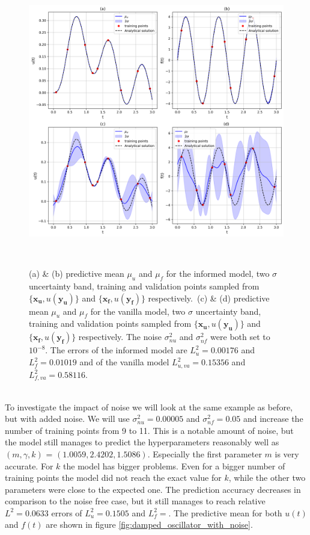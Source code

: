 \documentclass{article}
\begin{document}
\begin{figure}[htbp!]
    \centering
    \includegraphics[width=1\textwidth]{../final_examples/oscillator/merged_1d_plots.png}
    \caption{(a) \& (b) predictive mean $\mu_u$ and $\mu_f$ for the informed model, two $\sigma$ uncertainty band, training and validation points sampled from $\{\bm{x_u},u(\bm{y_u})\}$ and $\{\bm{x_f},u(\bm{y_f})\}$ respectively.\ (c) \& (d) predictive mean $\mu_u$ and $\mu_f$ for the vanilla model, two $\sigma$ uncertainty band, training and validation points sampled from $\{\bm{x_u},u(\bm{y_u})\}$ and $\{\bm{x_f},u(\bm{y_f})\}$ respectively. The noise $\sigma_{nu}^2$ and $\sigma_{nf}^2$ were both set to $10^{-8}$. The errors of the informed model are $L^2_u = 0.00176$ and $L^2_f = 0.01019$ and of the vanilla model $L^2_{u,va} = 0.15356$ and $L^2_{f,va} = 0.58116$.}
    ~\label{fig:damped_oscillator}
\end{figure}
\\
To investigate the impact of noise we will look at the same example as before, but with added noise. We will use $\sigma_{nu}^2 = 0.00005$ and $\sigma_{nf}^2 = 0.05$ and increase the number of training points from 9 to 11. This is a notable amount of noise, but the model still manages to predict the hyperparameters reasonably well as $(m,\gamma,k)$ = $(1.0059,2.4202,1.5086)$. Especially the first parameter $m$ is very accurate. For $k$ the model has bigger problems. Even for a bigger number of training points the model did not reach the exact value for $k$, while the other two parameters were close to the expected one. The prediction accuracy decreases in comparison to the noise free case, but it still manages to reach relative $L^2 = 0.0633$ errors of $L^2_u = 0.1505$ and $L^2_f = $. The predictive mean for both $u(t)$ and $f(t)$ are shown in figure \ref{fig:damped_oscillator_with_noise}.
\end{document}
